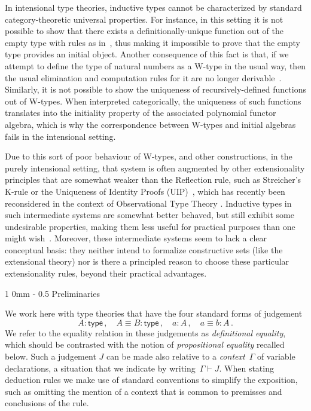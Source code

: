 \documentclass[reqno,10pt,a4paper,oneside]{amsart}
\makeatletter
\numberwithin{equation}{section}
\renewcommand{\section}{\@startsection
  {section}%
   {1}%
  {0mm}%
   {-\baselineskip}%
  {0.5\baselineskip}%
   {\Large\bfseries}}%
\theoremstyle{mythm}
\theoremstyle{mydef}
\theoremstyle{myrmk}
\newcommand{\deq}{\equiv}
\newcommand{\co}{\colon}
\newcommand{\type}{\mathsf{type}}
\makeatother
\begin{document}
\vspace{3cm}

In intensional type theories, inductive types cannot be characterized by standard category-theoretic
universal properties. For instance, in this setting it is not possible to show that there exists a 
definitionally-unique function out of the empty type with rules as in~\cite[Section~5.2]{NordstromB:marltt}, thus making it impossible to prove that the empty type provides an initial object. 
Another consequence of this fact is that, if we attempt to define the type of 
natural numbers as a W-type in the usual way, then 
the usual elimination and computation rules for it are no longer derivable~\cite{DybjerP:repids}. Similarly, it is not possible to show the uniqueness of recursively-defined functions out of W-types. When interpreted categorically, the uniqueness of such functions translates into the initiality property of the associated polynomial functor algebra, which is why the correspondence between W-types and initial algebras fails in the intensional setting.

Due to this sort of poor behaviour of W-types, and other constructions, in the purely intensional setting, that system is often augmented by other extensionality principles that are somewhat weaker than the Reflection rule, such as Streicher's K-rule  or the Uniqueness of Identity Proofs (UIP)~\cite{StreicherT:invitt}, which has recently been reconsidered
in the context of Observational Type Theory \cite{AltenkirchT:obsen}.  Inductive types in such intermediate systems are somewhat better behaved, but still exhibit some undesirable properties, making them less useful for practical purposes than one might wish~\cite{McBrideC:wtygnb}.  Moreover, these intermediate systems seem to lack a clear conceptual basis:  they neither intend to formalize constructive sets (like the extensional theory) nor is there a principled reason to choose these particular extensionality rules, beyond their practical advantages.  

\newpage

\section{Preliminaries}
\label{section:prelim}



We work here with type theories that have the four standard forms of judgement
\[
A \co \type \, , \quad A \deq B \co \type \, , \quad   a \co A \, , \quad a \deq b \co A \, . 
\]
We refer to the equality relation in these judgements as \emph{definitional equality}, 
which should be contrasted with the notion of \emph{propositional equality}
recalled below. 
Such a judgement $J$ can be made also relative to a \emph{context}~$\Gamma$ of variable declarations, a situation that we indicate by writing~$\Gamma \vdash J$. When stating deduction
rules we make use of standard conventions to simplify the exposition, such as omitting the mention
of a context that is common to premisses and conclusions of the rule.
\end{document}

